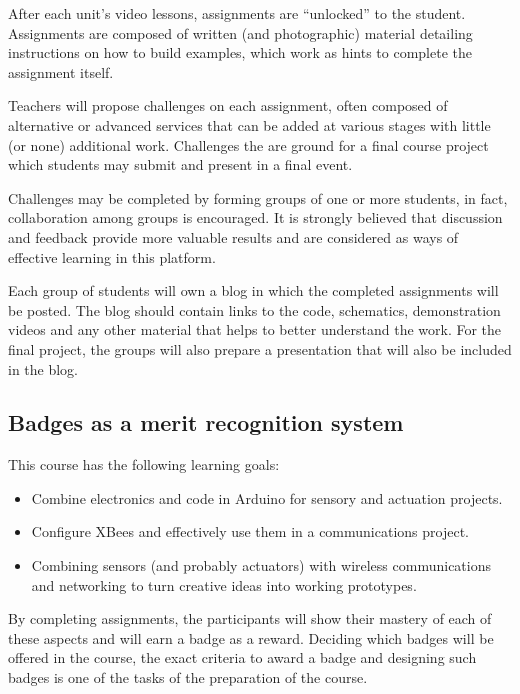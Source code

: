 \documentclass[a4paper,oneside]{book}   %
\begin{document}
After each unit's video lessons, assignments are ``unlocked'' to the student. Assignments are composed of written (and photographic) material detailing instructions on how to build examples, which work as hints to complete the assignment itself.


Teachers will propose challenges on each assignment, often composed of alternative or advanced services that can be added at various stages with little (or none) additional work. Challenges the are ground for a final course project which students may submit and present in a final event.

Challenges may be completed by forming groups of one or more students, in fact, collaboration among groups is encouraged. It is strongly believed that discussion and feedback provide more valuable results and are considered as ways of effective learning in this platform.

Each group of students will own a blog in which the completed assignments will be posted.
The blog should contain links to the code, schematics, demonstration videos and any other material that helps to better understand the work.
For the final project, the groups will also prepare a presentation that will also be included in the blog.

\subsection{Badges as a merit recognition system}

This course has the following learning goals:
\begin{itemize}
\item Combine electronics and code in Arduino for sensory and actuation projects.
\item Configure XBees and effectively use them in a communications project.
\item Combining sensors (and probably actuators) with wireless communications and networking to turn creative ideas into working prototypes.
\end{itemize}

By completing assignments, the participants will show their mastery of each of these aspects and will earn a badge as a reward.
Deciding which badges will be offered in the course, the exact criteria to award a badge and designing such badges is one of the tasks of the preparation of the course.
\end{document}
